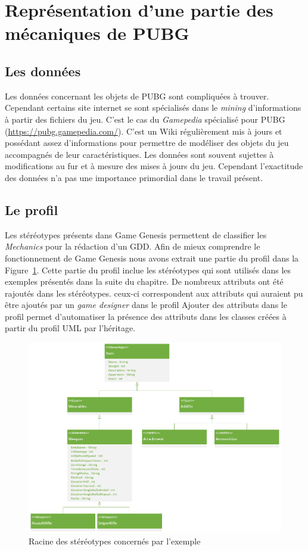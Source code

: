 \section{Représentation d'une partie des mécaniques de PUBG}
\subsection{Les données}
Les données concernant les objets de PUBG sont compliquées à trouver.
Cependant certains site internet se sont spécialisés dans le \emph{mining} d'informations à partir des fichiers du jeu.
C'est le cas du \emph{Gamepedia} spécialisé pour PUBG (\url{https://pubg.gamepedia.com/}).
C'est un Wiki régulièrement mis à jours et possédant assez d'informations pour permettre de modéliser des objets du jeu accompagnés de leur caractéristiques.
Les données sont souvent sujettes à modifications au fur et à mesure des mises à jours du jeu.
Cependant l'exactitude des données n'a pas une importance primordial dans le travail présent.


\subsection{Le profil}
Les stéréotypes présents dans Game Genesis permettent de classifier les \emph{Mechanics} pour la rédaction d'un GDD.
Afin de mieux comprendre le fonctionnement de Game Genesis nous avons extrait une partie du profil dans la Figure~\ref{fig.racine_stereo}.
Cette partie du profil inclue les stéréotypes qui sont utilisés dans les exemples présentés dans la suite du chapitre.
De nombreux attributs ont été rajoutés dans les stéréotypes. 
ceux-ci correspondent aux attributs qui auraient pu être ajoutés par un \emph{game designer} dans le profil
Ajouter des attributs dans le profil permet d'automatiser la présence des attributs dans les classes créées à partir du profil UML par l'héritage.
\begin{figure}[H]
    \centering
    \includegraphics[width=14cm]{10_img/chap6/root(stereotypes).PNG} 
    \caption{Racine des stéréotypes concernés par l'exemple}
    \label{fig.racine_stereo}
\end{figure}


